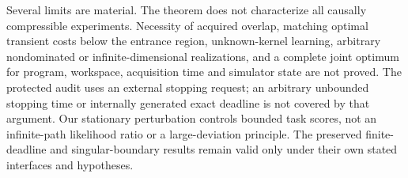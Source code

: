 Several limits are material. The theorem does not characterize all causally compressible experiments. Necessity of acquired overlap, matching optimal transient costs below the entrance region, unknown-kernel learning, arbitrary nondominated or infinite-dimensional realizations, and a complete joint optimum for program, workspace, acquisition time and simulator state are not proved. The protected audit uses an external stopping request; an arbitrary unbounded stopping time or internally generated exact deadline is not covered by that argument. Our stationary perturbation controls bounded task scores, not an infinite-path likelihood ratio or a large-deviation principle. The preserved finite-deadline and singular-boundary results remain valid only under their own stated interfaces and hypotheses.
